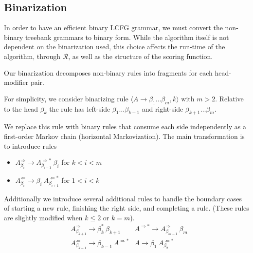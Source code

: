 \documentclass[11pt,letterpaper]{article}
\newcommand{\rules}{\mathcal{R}}
\newcommand{\Rule}[3]{#1 \rightarrow #2\ #3}
\newcommand{\RuleA}[3]{#1 \rightarrow #2^*\ #3}
\begin{document}
\subsection{Binarization}

In order to have an efficient binary LCFG grammar, we must convert the
non-binary treebank grammars to binary form.  While the algorithm
itself is not dependent on the binarization used, this choice affects
the run-time of the algorithm, through $\rules$, as well as the
structure of the scoring function.

Our binarization decomposes non-binary rules into fragments for
each head-modifier pair.


For simplicity, we consider binarizing rule $\langle A \rightarrow \beta_1 \ldots \beta_m,
k\rangle$ with $m > 2$. Relative to the head $\beta_k$
the rule has left-side $\beta_1 \ldots \beta_{k-1}$ and right-side
$\beta_{k+1} \ldots \beta_m$.

We replace this rule with binary rules that consume each side
independently as a first-order Markov chain (horizontal Markovization).
The main transformation is to introduce rules

\begin{itemize}

\item
$\Rule{A^{\Rightarrow}_{\beta_i}}{A^{\Rightarrow*}_{\beta_{i-1}}}{\beta_i}$ for $k < i < m$

\item
$\Rule{A^{\Leftarrow}_{\beta_i}} {\beta_i}{A^{\Leftarrow*}_{\beta_{i+1}}} $ for $1< i < k$
\end{itemize}



Additionally we introduce several additional rules to handle the boundary cases of starting a new rule, finishing the right side, and completing a rule. (These rules are slightly modified when $k\leq 2$ or $k=m$).
\begin{align*}
& \RuleA{A^{\Rightarrow}_{\beta_{k+1}}}{\beta_k}{\beta_{k+1}} & \Rule{A^{\Rightarrow*}} {A^{\Rightarrow}_{\beta_{m-1}}}{\beta_m} \\
 &\Rule{A^{\Leftarrow}_{\beta_{k-1}}}{\beta_{k-1}}{A^{\Rightarrow *}} & \Rule{A}{\beta_1}{ A^{\Leftarrow*}_{\beta_{2}}}\\
\end{align*}
\end{document}
